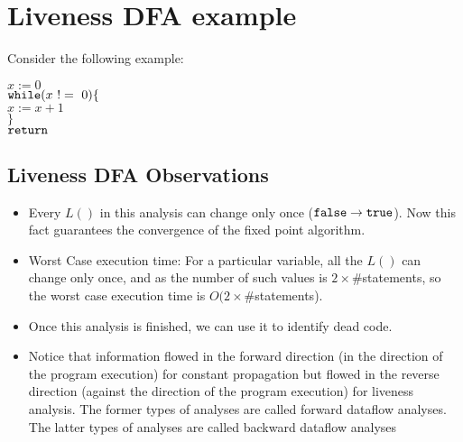 \setlength{\parindent}{0pt}

\section{Liveness DFA example}

Consider the following example:

\begin{framed}
    \hspace*{0.2 in} $x := 0$\\
    \hspace*{0.2 in} ${\tt while}(x~!=~0)\{$\\
    \hspace*{0.4 in} $x := x + 1$ \\
    \hspace*{0.2 in} $\}$ \\
    \hspace*{0.2 in} ${\tt return}$\\
    
\end{framed}
 

\subsection{Liveness DFA Observations}
\begin{itemize}
    \item Every $L()$ in this analysis can change only once (${\tt false} \rightarrow {\tt true}$). Now this fact guarantees the convergence of the fixed point algorithm.
    \item Worst Case execution time: For a particular variable, all the $L()$ can change only once, and as the number of such values is $2 \times \#$statements, so the worst case execution time is $O(2 \times \#$statements).
    \item Once this analysis is finished, we can use it to identify dead code.
    \item Notice that information flowed in the forward direction (in the direction of the program execution) for constant propagation but flowed in the reverse direction (against the direction of the program execution) for liveness analysis.
    The former types of analyses are called forward dataflow analyses. The latter types of analyses are called backward dataflow analyses
\end{itemize}